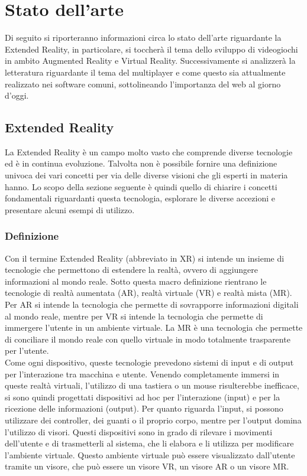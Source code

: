 \chapter{Stato dell'arte}\label{chap:Letteratura}
Di seguito si riporteranno informazioni circa lo stato dell'arte riguardante la Extended Reality, in particolare, si toccherà il tema dello sviluppo di videogiochi in ambito 
Augmented Reality e Virtual Reality. Successivamente si analizzerà la letteratura riguardante il tema del multiplayer e come questo sia attualmente realizzato nei software comuni,
sottolineando l'importanza del web al giorno d'oggi.

\section{Extended Reality}\label{sec:XR}
    La Extended Reality è un campo molto vasto che comprende diverse tecnologie ed è in continua evoluzione. Talvolta non è possibile fornire una definizione univoca dei vari 
    concetti per via delle diverse visioni che gli esperti in materia hanno. Lo scopo della sezione seguente è quindi quello di chiarire i concetti fondamentali riguardanti
    questa tecnologia, esplorare le diverse accezioni e presentare alcuni esempi di utilizzo.
    \subsection{Definizione}\label{subsec:XRDef}
        Con il termine Extended Reality (abbreviato in XR) si intende un insieme di tecnologie che permettono di estendere la realtà, ovvero di aggiungere informazioni al mondo 
        reale. Sotto questa macro definizione rientrano le tecnologie di realtà aumentata (AR), realtà virtuale (VR) e realtà mista (MR). Per AR si intende la tecnologia che permette 
        di sovrapporre informazioni digitali al mondo reale, mentre per VR si intende la tecnologia che permette di immergere l'utente in un ambiente virtuale. La MR è una tecnologia
        che permette di conciliare il mondo reale con quello virtuale in modo totalmente trasparente per l'utente. \\
        Come ogni dispositivo, queste tecnologie prevedono sistemi di input e di output per l'interazione tra macchina e utente. Venendo completamente immersi in queste realtà 
        virtuali, l'utilizzo di una tastiera o un mouse risulterebbe
        inefficace, si sono quindi progettati dispositivi ad hoc per l'interazione (input) e per la ricezione delle informazioni (output). Per quanto riguarda l'input, si possono
        utilizzare dei controller, dei guanti o il proprio corpo, mentre per l'output domina l'utilizzo di visori. Questi dispositivi sono in grado di rilevare i movimenti 
        dell'utente e di trasmetterli al sistema, che li elabora e li utilizza per modificare l'ambiente virtuale. Questo ambiente virtuale può essere visualizzato dall'utente 
        tramite un visore, che può essere un visore VR, un visore AR o un visore MR.
